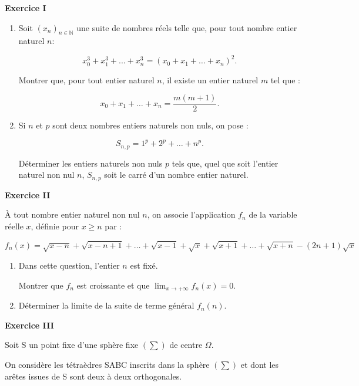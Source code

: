 \documentclass[a4paper,11pt]{article}
\newcommand{\N}{\mathbb{N}}
\begin{document}
\begin{center}\textbf{{\color{blue} Exercice I}}
\end{center}

\begin{enumerate}
\item Soit $\left(x_n\right)_{n\in \N}$ une suite de nombres réels telle que, pour tout nombre entier naturel $n$:

\[x_0 ^3 + x_1 ^3 +...+ x_n^3 = \left(x_0 + x_1 + \ldots + x_n\right)^2.\]

Montrer que, pour tout entier naturel $n$, il existe un entier naturel $m$ tel que :

\[x_0 + x_1 + \ldots + x_n = \dfrac{m(m + 1)}{2}.\]

\item Si $n$ et $p$ sont deux nombres entiers naturels non nuls, on pose :

\[S_{n, p} = 1^p + 2^p + \ldots + n^p.\]

Déterminer les entiers naturels non nuls $p$ tels que, quel que soit l'entier naturel non nul $n$, \:$S_{n, p}$ soit le carré d'un nombre entier naturel.
\end{enumerate}

\begin{center}\textbf{{\color{blue} Exercice II}}
\end{center}

À tout nombre entier naturel non nul $n$, on associe l'application $f_n$ de la variable réelle $x$, définie pour $x \geqslant n$ par :

\[f_n(x) = \sqrt{x-n} + \sqrt{x-n+1} + \ldots +\sqrt{x-1} + \sqrt{x} +\sqrt{x+1} +\ldots  + \sqrt{x+n} - (2n+1)\sqrt{x}\]

\begin{enumerate}
\item Dans cette question, l'entier $n$ est fixé.

Montrer que $f_n$ est croissante et que $\displaystyle\lim_{x \to + \infty}f_n(x) = 0$.
\item Déterminer la limite de la suite de terme général $f_n(n)$.
\end{enumerate}

\begin{center}\textbf{{\color{blue} Exercice III}}
\end{center}

Soit S un point fixe d'une sphère fixe $(\sum)$ de centre $\Omega$.

On considère les tétraèdres SABC inscrits dans la sphère $(\sum)$ et dont les arêtes issues de S sont deux à deux orthogonales.
\end{document}
